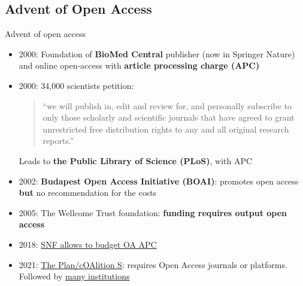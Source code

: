 \documentclass[10pt,compress,serif,aspectratio=169]{beamer}
\begin{document}

 \subsection{Advent of Open Access}

 \begin{frame}[t]{Advent of open access}
\begin{itemize}

\item 2000: Foundation of \textbf{BioMed Central} publisher (now in Springer Nature) and online open-access with \textbf{article processing charge (APC)}
\item 2000: 34,000 scientists petition:
  \begin{quote}
    “we will publish in, edit and review for, and personally subscribe to only those scholarly and scientific journals that have agreed to grant unrestricted free distribution rights to any and all original research reports.”
  \end{quote}
  Leads to \textbf{the Public Library of Science (PLoS)}, with APC

  \item 2002: \textbf{Budapest Open Access Initiative (BOAI)}: promotes open access \textbf{but} no recommendation for the costs
  \item 2005: The Wellcome Trust foundation: \textbf{funding requires output open access}
  \item 2018: \href{https://www.snf.ch/en/bQ17hb9mM1NC4awy/news/news-181010-make-open-access-the-new-normal}{SNF allows to budget OA APC}
  \item 2021: \href{https://www.coalition-s.org/}{The Plan/cOAlition S}: requires Open Access journals or platforms. Followed by \href{https://www.coalition-s.org/supporters/}{many institutions}
 \end{itemize}
\end{frame}
\end{document}
